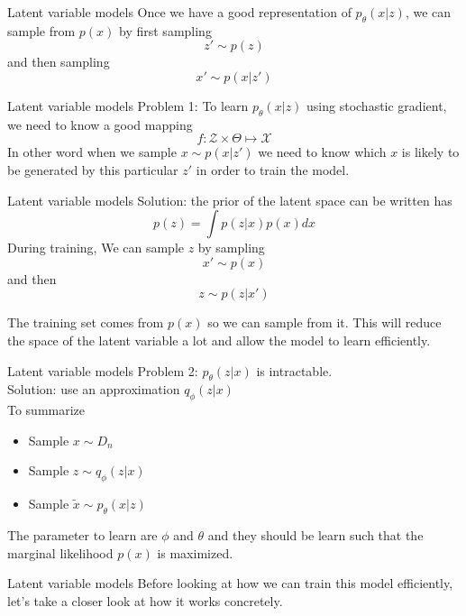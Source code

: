 \documentclass{beamer}
\begin{document}
\begin{frame}{Latent variable models}
Once we have a good representation of $p_\theta (x|z)$, we can sample from $p(x)$ by first sampling
\[
	z'\sim p(z)
\]
and then sampling\\
\[
	x'\sim p(x|z')
\]
\end{frame}

\begin{frame}{Latent variable models}
Problem 1: To learn $p_\theta(x|z)$ using stochastic gradient, we need to know a good mapping 
\[
	f: \mathcal{Z}\times \Theta \mapsto \mathcal{X}
\]
In other word when we sample $x\sim p(x|z')$ we need to know which $x$ is likely to be generated by this particular $z'$ in order to train the model.
\end{frame}

\begin{frame}{Latent variable models}
Solution: the prior of the latent space can be written has
\[
p(z) = \int p(z|x) p(x) dx
\]
During training, We can sample $z$ by sampling \\
\[
x'\sim p(x)
\]
and then 
\[z\sim p(z|x')\]

 The training set comes from $p(x)$ so we can sample from it. This will reduce the space of the latent variable a lot and allow the model to learn efficiently.
\end{frame}

\begin{frame}{Latent variable models}
Problem 2: $p_\theta(z|x)$ is intractable. \\

Solution: use an approximation $q_\phi(z|x)$\\

To summarize
\begin{itemize}
	\item Sample $x \sim D_n$
	\item Sample $z \sim q_\phi(z|x)$
	\item Sample $\tilde{x} \sim p_\theta(x|z)$
\end{itemize}
The parameter to learn are $\phi$ and $\theta$ and they should be learn such that the marginal likelihood $p(x)$ is maximized.
\end{frame}

\begin{frame}{Latent variable models}
	Before looking at how we can train this model efficiently, let's take a closer look at how it works concretely.
\end{frame}
\end{document}
